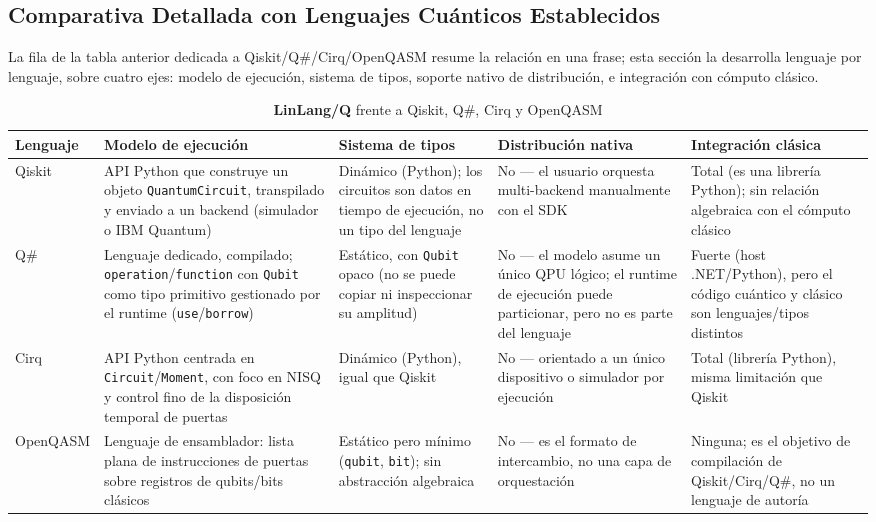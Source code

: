\documentclass[12pt, a4paper, openany]{report}
\theoremstyle{definition}
\newcommand{\linlangQ}{\textbf{LinLang/Q}}
\begin{document}
\subsection{Comparativa Detallada con Lenguajes Cuánticos Establecidos}
\label{sec:comparativa-detallada}

La fila de la tabla anterior dedicada a Qiskit/Q\#/Cirq/OpenQASM resume la relación en una frase; esta sección la desarrolla lenguaje por lenguaje, sobre cuatro ejes: modelo de ejecución, sistema de tipos, soporte nativo de distribución, e integración con cómputo clásico.

\begin{table}[H]
\centering
\caption{\linlangQ{} frente a Qiskit, Q\#, Cirq y OpenQASM}
\label{tab:comparativa-detallada}
\begin{tabularx}{\linewidth}{@{}L{1.8cm}L{3.3cm}L{3.3cm}L{2.3cm}L{3.3cm}@{}}
\toprule
\textbf{Lenguaje} & \textbf{Modelo de ejecución} & \textbf{Sistema de tipos} & \textbf{Distribución nativa} & \textbf{Integración clásica} \\
\midrule
Qiskit & API Python que construye un objeto \texttt{QuantumCircuit}, transpilado y enviado a un backend (simulador o IBM Quantum) & Dinámico (Python); los circuitos son datos en tiempo de ejecución, no un tipo del lenguaje & No — el usuario orquesta multi-backend manualmente con el SDK & Total (es una librería Python); sin relación algebraica con el cómputo clásico \\
\addlinespace
Q\# & Lenguaje dedicado, compilado; \texttt{operation}/\texttt{function} con \texttt{Qubit} como tipo primitivo gestionado por el runtime (\texttt{use}/\texttt{borrow}) & Estático, con \texttt{Qubit} opaco (no se puede copiar ni inspeccionar su amplitud) & No — el modelo asume un único QPU lógico; el runtime de ejecución puede particionar, pero no es parte del lenguaje & Fuerte (host .NET/Python), pero el código cuántico y clásico son lenguajes/tipos distintos \\
\addlinespace
Cirq & API Python centrada en \texttt{Circuit}/\texttt{Moment}, con foco en NISQ y control fino de la disposición temporal de puertas & Dinámico (Python), igual que Qiskit & No — orientado a un único dispositivo o simulador por ejecución & Total (librería Python), misma limitación que Qiskit \\
\addlinespace
OpenQASM & Lenguaje de ensamblador: lista plana de instrucciones de puertas sobre registros de qubits/bits clásicos & Estático pero mínimo (\texttt{qubit}, \texttt{bit}); sin abstracción algebraica & No — es el formato de intercambio, no una capa de orquestación & Ninguna; es el objetivo de compilación de Qiskit/Cirq/Q\#, no un lenguaje de autoría \\

\end{tabularx}
\end{table}
\end{document}
